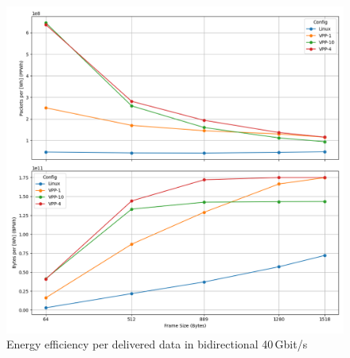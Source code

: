 \begin{figure}[!htbp]
    \centering
    \includegraphics[width=\linewidth]{images/consumption-bi-40g.png}
    \caption{Energy efficiency per delivered data in bidirectional 40\,Gbit/s}
    \label{fig:bi-40g}
\end{figure}

